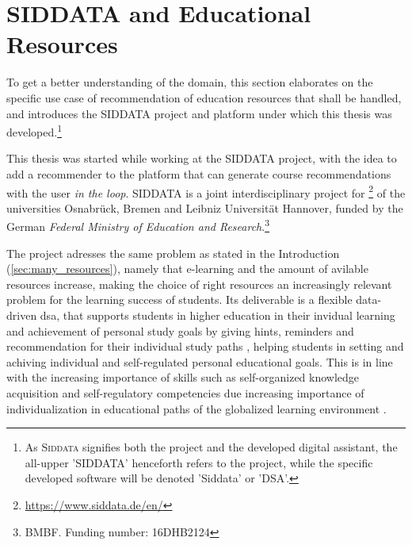 


\section{SIDDATA and Educational Resources}


To get a better understanding of the domain, this section elaborates on the specific use case of recommendation of education resources that shall be handled, and introduces the SIDDATA project and platform under which this thesis was developed.\footnote{As \textsc{Siddata} signifies both the project and the developed digital assistant, the all-upper 'SIDDATA' henceforth refers to the project, while the specific developed software will be denoted 'Siddata' or 'DSA'.}

This thesis was started while working at the SIDDATA project, with the idea to add a recommender to the platform that can generate course recommendations with the user \textit{in the loop}. SIDDATA is a joint interdisciplinary project for \footnote{\url{https://www.siddata.de/en/}} of the universities Osnabrück, Bremen and Leibniz Universität Hannover, funded by the German \emph{Federal Ministry of Education and Research}.\footnote{BMBF. Funding number: 16DHB2124} 

The project adresses the same problem as stated in the Introduction (\ref{sec:many_resources}), namely that e-learning and the amount of avilable resources increase, making the choice of right resources an increasingly relevant problem for the learning success of students. Its deliverable is a flexible data-driven \gls{dsa}, that supports students in higher education in their invidual learning and achievement of personal study goals by giving hints, reminders and recommendation for their individual study paths \cite{Schurz2021}, helping students in setting and achiving individual and self-regulated personal educational goals. This is in line with the increasing importance of skills such as self-organized knowledge acquisition and self-regulatory competencies due increasing importance of individualization in educational paths of the globalized learning environment \cite{Ehlers2019,Schurz2021}.

